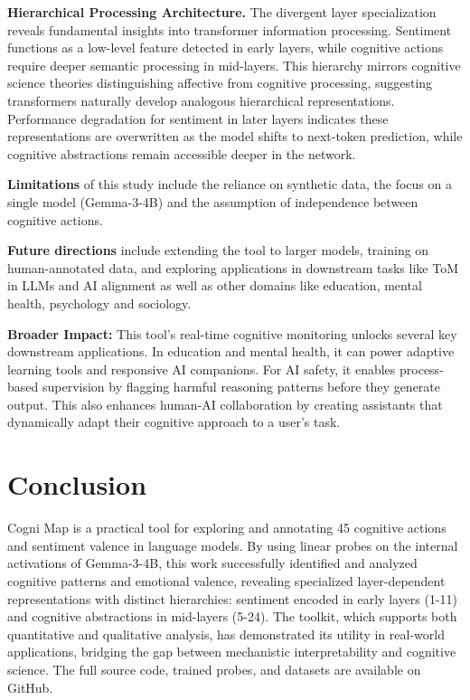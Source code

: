 \documentclass[letterpaper]{article}
\begin{document}
\textbf{Hierarchical Processing Architecture.} The divergent layer specialization reveals fundamental insights into transformer information processing. Sentiment functions as a low-level feature detected in early layers, while cognitive actions require deeper semantic processing in mid-layers. This hierarchy mirrors cognitive science theories distinguishing affective from cognitive processing, suggesting transformers naturally develop analogous hierarchical representations. Performance degradation for sentiment in later layers indicates these representations are overwritten as the model shifts to next-token prediction, while cognitive abstractions remain accessible deeper in the network.

\textbf{Limitations} of this study include the reliance on synthetic data, the focus on a single model (Gemma-3-4B) and the assumption of independence between cognitive actions.

\textbf{Future directions} include extending the tool to larger models, training on human-annotated data, and exploring applications in downstream tasks like ToM in LLMs and AI alignment as well as other domains like education, mental health, psychology and sociology.

\textbf{Broader Impact:} This tool's real-time cognitive monitoring unlocks several key downstream applications. In education and mental health, it can power adaptive learning tools and responsive AI companions. For AI safety, it enables process-based supervision by flagging harmful reasoning patterns before they generate output. This also enhances human-AI collaboration by creating assistants that dynamically adapt their cognitive approach to a user's task.

\section{Conclusion}

Cogni Map is a practical tool for exploring and annotating 45 cognitive actions and sentiment valence in language models. By using linear probes on the internal activations of Gemma-3-4B, this work successfully identified and analyzed cognitive patterns and emotional valence, revealing specialized layer-dependent representations with distinct hierarchies: sentiment encoded in early layers (1-11) and cognitive abstractions in mid-layers (5-24). The toolkit, which supports both quantitative and qualitative analysis, has demonstrated its utility in real-world applications, bridging the gap between mechanistic interpretability and cognitive science. The full source code, trained probes, and datasets are available on GitHub.
\end{document}
